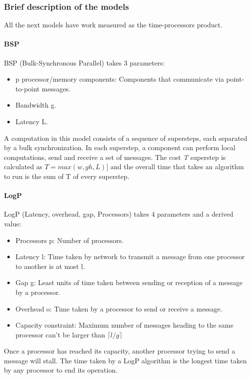 \documentclass[12pt,a4paper]{article}
\begin{document}
\subsubsection{Brief description of the models}
All the next models have work measured as the time-processors product.
\paragraph{BSP}
BSP (Bulk-Synchronous Parallel) takes 3 parameters:
\begin{itemize}
	\item p processor/memory components: Components that communicate via point-to-point messages.
	\item Bandwidth g.
	\item Latency L.
\end{itemize}
A computation in this model consists of a sequence of supersteps, each separated by a bulk synchronization. In each superstep, a component can perform 
local computations, send and receive a set of messages. The cost \textit T superstep is calculated as $T = max(w, gh, L)]$ and the overall time 
that takes an algorithm to run is the sum of T of every superstep.
\paragraph{LogP}
LogP (Latency, overhead, gap, Processors) takes 4 parameters and a derived value:
\begin{itemize}
	\item Processors p: Number of processors.
	\item Latency l: Time taken by network to transmit a message from one processor to another is at most l.
	\item Gap g: Least units of time taken between sending or reception of a message by a processor.
	\item Overhead o: Time taken by a processor to send or receive a message.
	\item Capacity constraint: Maximum number of messages heading to the same processor can't be larger than $\lceil l/g \rceil$
\end{itemize}
Once a processor has reached its capacity, another processor trying to send a message will stall. The time taken by a LogP algorithm is the longest 
time taken by any processor to end its operation.
\end{document}
